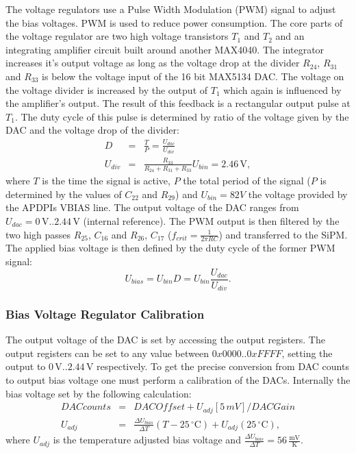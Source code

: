 \documentclass[]{article}
\begin{document}
The voltage regulators use a Pulse Width Modulation (PWM) signal to adjust the bias voltages. PWM is used to reduce power consumption.
The core parts of the voltage regulator are two high voltage transistors $T_1$ and $T_2$ and an integrating amplifier circuit built around another MAX4040. The integrator increases
it's output voltage as long as the voltage drop at the divider $R_{24}$, $R_{31}$ and $R_{33}$ is below the voltage input of the 16 bit MAX5134 DAC.
The voltage on the voltage divider is increased by the output of $T_1$ which again is influenced by the amplifier's output. The result of this feedback is a rectangular output
pulse at $T_1$. The duty cycle of this pulse is determined by ratio of the voltage given by the DAC and the voltage drop of the divider:
	\begin{eqnarray}
		D &=& \frac{T}{P} = \frac{U_{dac}}{U_{div}} \\
		U_{div} &=& \frac{R_{33}}{R_{24} + R_{31} + R_{33}} U_{bin} = 2.46\,\text{V},
	\end{eqnarray}
where $T$ is the time the signal is active, $P$ the total period of the signal ($P$ is determined by the values of $C_{22}$ and $R_{29}$) and $U_{bin}=82V$ the voltage provided by the 
APDPIs VBIAS line. The output voltage of the DAC ranges from $U_{dac}=0\, \text{V} .. 2.44\, \text{V}$ (internal reference). The PWM output is then filtered by the two high passes 
$R_{25}$, $C_{16}$ and $R_{26}$, $C_{17}$ ($f_{crit} = \frac{1}{2 \pi RC}$) and transferred to the SiPM. The applied bias voltage is then defined by the duty cycle of the former 
PWM signal:
	\begin{equation}
		U_{bias} = U_{bin} D = U_{bin} \frac{U_{dac}}{U_{div}}.
	\end{equation}

\subsubsection{Bias Voltage Regulator Calibration}
The output voltage of the DAC is set by accessing the output registers. The output registers can be set to any value between $0x0000 .. 0xFFFF$, setting the output to 
$0\, \text{V}..2.44\, \text{V}$ respectively. To get the precise conversion from DAC counts to output bias voltage one must perform a calibration of the DACs. Internally 
the bias voltage set by the following calculation:
	\begin{eqnarray}
		DACcounts &=& DACOffset + U_{adj}[5\,mV]/DACGain \\
		U_{adj} &=& \frac{\Delta U_{bias}}{\Delta T}(T - 25\,^{\circ} \text{C}) + U_{adj}(25\,^{\circ} \text{C}),
	\end{eqnarray} 
where $U_{adj}$ is the temperature adjusted bias voltage and $\frac{\Delta U_{bias}}{\Delta T} = 56\,\frac{\text{mV}}{\text{K}}$. 
\end{document}
